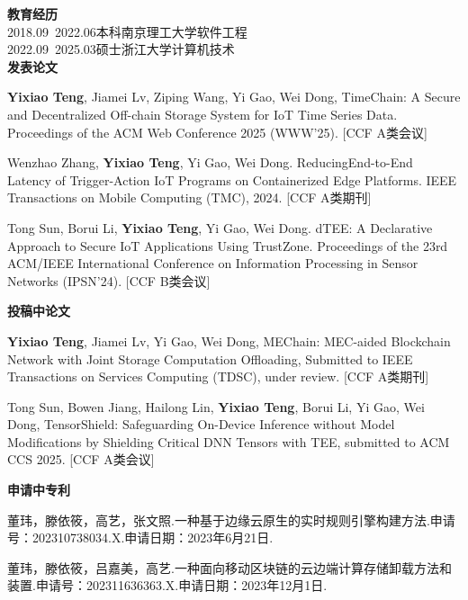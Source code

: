 \cleardoublepage
{}
\noindent\textbf{教育经历}\\
2018.09~2022.06\quad  本科\quad  南京理工大学\quad  软件工程\\
2022.09~2025.03\quad  硕士\quad  浙江大学\quad \quad \quad  计算机技术\\


\noindent\textbf{发表论文}
\begin{enumerate}[label={[\arabic*]},leftmargin=*]
\item \textbf{Yixiao Teng}, Jiamei Lv, Ziping Wang, Yi Gao, Wei Dong, TimeChain: A Secure and Decentralized Off-chain Storage System for IoT Time Series Data. Proceedings of the ACM Web Conference 2025 (WWW'25). [CCF A类会议]
\item Wenzhao Zhang, \textbf{Yixiao Teng}, Yi Gao, Wei Dong. ReducingEnd-to-End Latency of Trigger-Action IoT Programs on Containerized Edge Platforms. IEEE Transactions on Mobile Computing (TMC), 2024. [CCF A类期刊]
\item Tong Sun, Borui Li, \textbf{Yixiao Teng}, Yi Gao, Wei Dong. dTEE: A Declarative Approach to Secure IoT Applications Using TrustZone. Proceedings of the 23rd ACM/IEEE International Conference on Information Processing in Sensor Networks (IPSN'24). [CCF B类会议]\\
\end{enumerate}

\noindent\textbf{投稿中论文}
\begin{enumerate}[label={[\arabic*]},leftmargin=*]
    \item \textbf{Yixiao Teng}, Jiamei Lv, Yi Gao, Wei Dong, MEChain: MEC-aided Blockchain Network with Joint Storage Computation Offloading, Submitted to IEEE Transactions on Services Computing (TDSC), under review. [CCF A类期刊]
    \item Tong Sun, Bowen Jiang, Hailong Lin, \textbf{Yixiao Teng}, Borui Li, Yi Gao, Wei Dong, TensorShield: Safeguarding On-Device Inference without Model Modifications by Shielding Critical DNN Tensors with TEE, submitted to ACM CCS 2025. [CCF A类会议]\\
\end{enumerate}

\noindent\textbf{申请中专利}
\begin{enumerate}[label={[\arabic*]},leftmargin=*]
    \item 董玮，滕依筱，高艺，张文照.一种基于边缘云原生的实时规则引擎构建方法.申请号：202310738034.X.申请日期：2023年6月21日.
    \item 董玮，滕依筱，吕嘉美，高艺.一种面向移动区块链的云边端计算存储卸载方法和装置.申请号：202311636363.X.申请日期：2023年12月1日.
\end{enumerate}